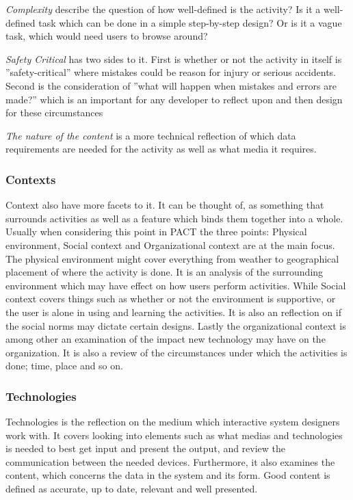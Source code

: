 \textit{Complexity} describe the question of how well-defined is the activity?
Is it a well-defined task which can be done in a simple step-by-step design?
Or is it a vague task, which would need users to browse around?

\textit{Safety Critical} has two sides to it.
First is whether or not the activity in itself is ''safety-critical'' where mistakes could be reason for injury or serious accidents.
Second is the consideration of ''what will happen when mistakes and errors are made?'' which is an important for any developer to reflect upon and then design for these circumstances

\textit{The nature of the content} is a more technical reflection of which data requirements are needed for the activity as well as what media it requires.

\subsubsection{Contexts}
Context also have more facets to it.
It can be thought of, as something that surrounds activities as well as a feature which binds them together into a whole.
Usually when considering this point in PACT the three points: Physical environment, Social context and Organizational context are at the main focus.
\\\indent
The physical environment might cover everything from weather to geographical placement of where the activity is done.
It is an analysis of the surrounding environment which may have effect on how users perform activities.
While Social context covers things such as whether or not the environment is supportive, or the user is alone in using and learning the activities.
It is also an reflection on if the social norms may dictate certain designs.
Lastly the organizational context is among other an examination of the impact new technology may have on the organization.
It is also a review of the circumstances under which the activities is done; time, place and so on.

\subsubsection{Technologies}
Technologies is the reflection on the medium which interactive system designers work with.
It covers looking into elements such as what medias and technologies is needed to best get input and present the output, and review the communication between the needed devices.
Furthermore, it also examines the content, which concerns the data in the system and its form.
Good content is defined as accurate, up to date, relevant and well presented.

